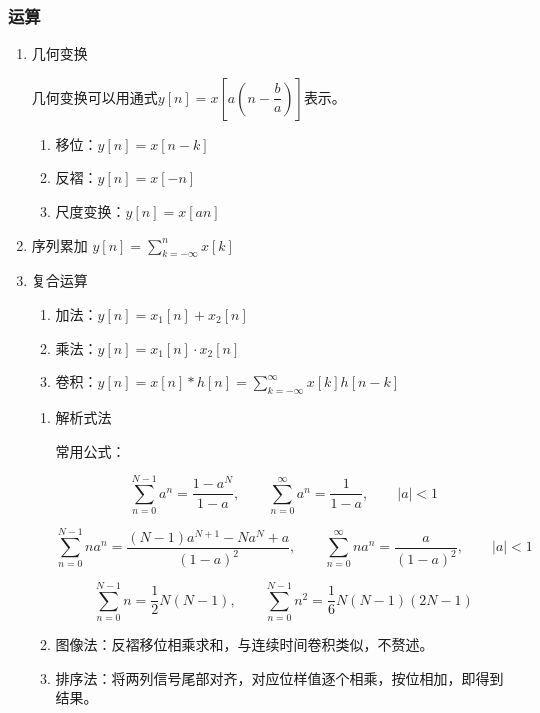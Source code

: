 \documentclass[UTF8,fontset=fandol,zihao=5]{ctexart}
\begin{document}
\subsubsection{运算}

\begin{enumerate}

  \item 几何变换
    
  几何变换可以用通式$\displaystyle y[n]=x\left [ a\left ( n - \dfrac{b}{a} \right ) \right ]$表示。
    
    \begin{enumerate}[label=(\arabic*)]
      \item 移位：$y[n]=x[n-k]$
      \item 反褶：$y[n]=x[-n]$
      \item 尺度变换：$y[n]=x[an]$
    \end{enumerate}

  \item 序列累加 $\displaystyle y[n]=\sum_{k=-\infty}^{n} x[k]$
  
  \item 复合运算
    \begin{enumerate}[label=(\arabic*)]
      \item 加法：$y[n]=x_1[n] + x_2[n]$
      \item 乘法：$y[n]=x_1[n] \cdot x_2[n]$
      \item 卷积：$y[n]=x[n] * h[n] = \displaystyle \sum_{k=-\infty}^{\infty} x[k] h[n-k]$
    \end{enumerate}
  
  \begin{methodbox}[【技巧】卷积计算]
    \begin{enumerate}[label=\arabic*.]
      \item 解析式法
      
      常用公式：
      
      \[
      \sum_{n=0}^{N-1} a^n = \frac{1-a^N}{1-a}, \qquad
      \sum_{n=0}^{\infty} a^n = \frac{1}{1-a}, \qquad |a|<1
      \]

      \[
      \sum_{n=0}^{N-1} n a^n = \frac{(N-1)a^{N+1}-Na^N+a}{(1-a)^2}, \qquad
      \sum_{n=0}^{\infty} n a^n = \frac{a}{(1-a)^2}, \qquad |a|<1
      \]

      \[
      \sum_{n=0}^{N-1} n = \frac{1}{2}N(N-1),\qquad
      \sum_{n=0}^{N-1} n^2 = \frac{1}{6}N(N-1)(2N-1)
      \]

      \item 图像法：反褶移位相乘求和，与连续时间卷积类似，不赘述。

      \item 排序法：将两列信号尾部对齐，对应位样值逐个相乘，按位相加，即得到结果。
    \end{enumerate}
  \end{methodbox}
  
\end{enumerate}
\end{document}
